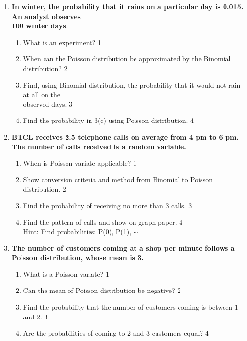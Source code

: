 \documentclass[a4paper,oneside, margin=1.4in]{book}
\begin{document}
\begin{enumerate}
  \item
  \textbf{In winter, the probability that it rains on a particular day is 0.015. An analyst observes \\ 100 winter days.}
 
  \begin{enumerate}
    \item
	What is an experiment? \hfill 1
    \item
    	When can the Poisson distribution be approximated by the Binomial distribution? \hfill 2
    \item
    	Find, using Binomial distribution, the probability that  it would not rain at all on the \\ observed days. \hfill 3
     \item
     	Find the probability in 3(c) using Poisson distribution.  \hfill 4
  \end{enumerate}

  \item
	  \textbf{BTCL receives 2.5 telephone calls on average from 4 pm to 6 pm. The number of calls received is a random variable. } 
  
  \begin{enumerate}
    \item
	When is Poisson variate applicable? \hfill 1
    \item
	Show conversion criteria and method from Binomial to Poisson distribution. \hfill 2
    \item  
	Find the probability of receiving no more than 3 calls. \hfill 3
    \item
	Find the pattern of calls and show on graph paper.  \hfill 4 \\
	Hint: Find probabilities: P(0), P(1), $\cdots$
  \end{enumerate}
  
  \item
	  \textbf{The number of customers coming at a shop per minute follows a Poisson distribution,  whose mean is 3.} 
  
  \begin{enumerate}
    \item
	What is a Poisson variate? \hfill 1
    \item
	Can the mean of Poisson distribution be negative? \hfill 2
    \item  
	Find the probability that the number of customers coming is between 1 and 2. \hfill 3
    \item
	Are the probabilities of coming to 2 and 3 customers equal?  \hfill 4
  \end{enumerate}


\end{enumerate}
\end{document}

